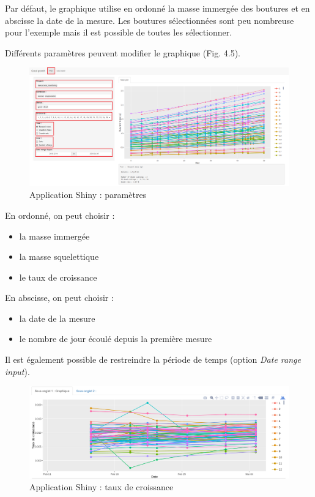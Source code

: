 \documentclass[]{report}
\providecommand{\tightlist}{%
  \setlength{\itemsep}{0pt}\setlength{\parskip}{0pt}}
\begin{document}
\vspace{0.5 cm}

Par défaut, le graphique utilise en ordonné la masse immergée des
boutures et en abscisse la date de la mesure. Les boutures sélectionnées
sont peu nombreuse pour l'exemple mais il est possible de toutes les
sélectionner.

\vspace{0.5 cm}

Différents paramètres peuvent modifier le graphique (Fig. 4.5).

\begin{figure}
\centering
\includegraphics[width=15.00000cm]{../image/notebook-plot2.PNG}
\caption{Application Shiny : paramètres}
\end{figure}

\vspace{0.5cm}

\null
\newpage

En ordonné, on peut choisir :

\begin{itemize}
\tightlist
\item
  la masse immergée
\item
  la masse squelettique
\item
  le taux de croissance 
\end{itemize}

En abscisse, on peut choisir :

\begin{itemize}
\tightlist
\item
  la date de la mesure
\item
  le nombre de jour écoulé depuis la première mesure
\end{itemize}

Il est également possible de restreindre la période de temps (option
\emph{Date range input}).

\begin{figure}[h!]
\includegraphics[]{../image/shiny3.PNG}
\caption{Application Shiny : taux de croissance}
\end{figure}
\end{document}
